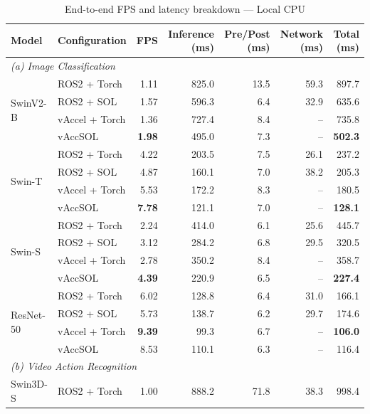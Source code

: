 \begin{table}[t]
\centering
\caption{End-to-end FPS and latency breakdown --- Local CPU}
\label{tab:e2e-local-cpu}
\small
\begin{tabular}{llrrrrr}
\toprule
Model & Configuration & FPS & Inference (ms) & Pre/Post (ms) & Network (ms) & Total (ms) \\
\midrule
\multicolumn{7}{l}{\textit{(a) Image Classification}} \\
\midrule
\multirow{4}{*}{SwinV2-B} & ROS2 + Torch & 1.11 & 825.0 & 13.5 & 59.3 & 897.7 \\
 & ROS2 + SOL & 1.57 & 596.3 & 6.4 & 32.9 & 635.6 \\
 & vAccel + Torch & 1.36 & 727.4 & 8.4 & -- & 735.8 \\
 & vAccSOL & \textbf{1.98} & 495.0 & 7.3 & -- & \textbf{502.3} \\
\cmidrule(lr){1-7}
\multirow{4}{*}{Swin-T} & ROS2 + Torch & 4.22 & 203.5 & 7.5 & 26.1 & 237.2 \\
 & ROS2 + SOL & 4.87 & 160.1 & 7.0 & 38.2 & 205.3 \\
 & vAccel + Torch & 5.53 & 172.2 & 8.3 & -- & 180.5 \\
 & vAccSOL & \textbf{7.78} & 121.1 & 7.0 & -- & \textbf{128.1} \\
\cmidrule(lr){1-7}
\multirow{4}{*}{Swin-S} & ROS2 + Torch & 2.24 & 414.0 & 6.1 & 25.6 & 445.7 \\
 & ROS2 + SOL & 3.12 & 284.2 & 6.8 & 29.5 & 320.5 \\
 & vAccel + Torch & 2.78 & 350.2 & 8.4 & -- & 358.7 \\
 & vAccSOL & \textbf{4.39} & 220.9 & 6.5 & -- & \textbf{227.4} \\
\cmidrule(lr){1-7}
\multirow{4}{*}{ResNet-50} & ROS2 + Torch & 6.02 & 128.8 & 6.4 & 31.0 & 166.1 \\
 & ROS2 + SOL & 5.73 & 138.7 & 6.2 & 29.7 & 174.6 \\
 & vAccel + Torch & \textbf{9.39} & 99.3 & 6.7 & -- & \textbf{106.0} \\
 & vAccSOL & 8.53 & 110.1 & 6.3 & -- & 116.4 \\
\cmidrule(lr){1-7}
\midrule
\multicolumn{7}{l}{\textit{(b) Video Action Recognition}} \\
\midrule
\multirow{4}{*}{Swin3D-S} & ROS2 + Torch & 1.00 & 888.2 & 71.8 & 38.3 & 998.4 \\

\end{tabular}
\end{table}
